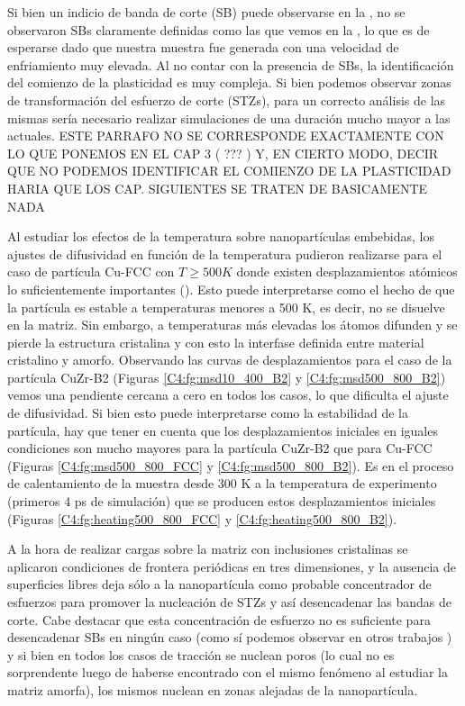 Si bien un indicio de banda de corte (SB) puede observarse en la , no se observaron SBs claramente definidas como las que vemos en la , lo que es de esperarse dado que nuestra muestra fue generada con una velocidad de enfriamiento muy elevada. Al no contar con la presencia de SBs, la identificación del comienzo de la plasticidad es muy compleja. Si bien podemos observar zonas de transformación del esfuerzo de corte (STZs), para un correcto análisis de las mismas sería necesario realizar simulaciones de una duración mucho mayor a las actuales. ESTE PARRAFO NO SE CORRESPONDE EXACTAMENTE CON LO QUE PONEMOS EN EL CAP 3 ( ??? ) Y, EN CIERTO MODO, DECIR QUE NO PODEMOS IDENTIFICAR EL COMIENZO DE LA PLASTICIDAD HARIA QUE LOS CAP. SIGUIENTES SE TRATEN DE BASICAMENTE NADA

Al estudiar los efectos de la temperatura sobre nanopartículas embebidas, los ajustes de difusividad en función de la temperatura pudieron realizarse para el caso de partícula Cu-FCC con $T \geq 500 K$ donde existen desplazamientos atómicos lo suficientemente importantes (). Esto puede interpretarse como el hecho de que la partícula es estable a temperaturas menores a 500 K, es decir, no se disuelve en la matriz. Sin embargo, a temperaturas más elevadas los átomos difunden y se pierde la estructura cristalina y con esto la interfase definida entre material cristalino y amorfo. Observando las curvas de desplazamientos para el caso de la partícula CuZr-B2 (Figuras \ref{C4:fg:msd10_400_B2} y \ref{C4:fg:msd500_800_B2}) vemos una pendiente cercana a cero en todos los casos, lo que dificulta el ajuste de difusividad. Si bien esto puede interpretarse como la estabilidad de la partícula, hay que tener en cuenta que los desplazamientos iniciales en iguales condiciones son mucho mayores para la partícula CuZr-B2 que para Cu-FCC (Figuras \ref{C4:fg:msd500_800_FCC} y \ref{C4:fg:msd500_800_B2}). Es en el proceso de calentamiento de la muestra desde 300 K a la temperatura de experimento (primeros 4 ps de simulación) que se producen estos desplazamientos iniciales (Figuras \ref{C4:fg:heating500_800_FCC} y \ref{C4:fg:heating500_800_B2}).

A la hora de realizar cargas sobre la matriz con inclusiones cristalinas se aplicaron condiciones de frontera periódicas en tres dimensiones, y la ausencia de superficies libres deja sólo a la nanopartícula como probable concentrador de esfuerzos para promover la nucleación de STZs y así desencadenar las bandas de corte. Cabe destacar que esta concentración de esfuerzo no es suficiente para desencadenar SBs en ningún caso (como sí podemos observar en otros trabajos \citep{albe13,brink15,adibi13,adibi14}) y si bien en todos los casos de tracción se nuclean poros (lo cual no es sorprendente luego de haberse encontrado con el mismo fenómeno al estudiar la matriz amorfa), los mismos nuclean en zonas alejadas de la nanopartícula.


